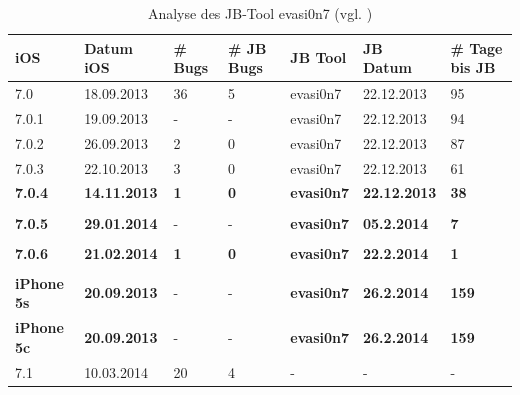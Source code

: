 \begin{table}[htp!]
    \begin{center}
        \begin{tabular}{| p{20mm} | p{22mm} | p{17mm} | p{25mm} | p{20mm} | p{22mm} | p{15mm} |} \hline
            \textbf{iOS} & \textbf{Datum iOS} & \textbf{\# Bugs} & \textbf{\# JB Bugs} & \textbf{JB Tool} & \textbf{JB Datum} & \textbf{\# Tage bis JB} \\ \hline 
7.0 & 18.09.2013 &	36 & 5 & evasi0n7 & 22.12.2013 & 95 \\ \hline
7.0.1 & 19.09.2013 & - & - & evasi0n7 & 22.12.2013 &  94 \\ \hline
7.0.2 & 26.09.2013 & 2 & 0 & evasi0n7 & 22.12.2013 & 87 \\ \hline
7.0.3 & 22.10.2013 & 3 & 0 & evasi0n7 & 22.12.2013 & 61\\ \hline
\textbf{7.0.4 }& \textbf{14.11.2013} & \textbf{1} & \textbf{0} & \textbf{evasi0n7 }& \textbf{22.12.2013} & \textbf{38} \\ \hline
 & & & & & & \\ \hline
\textbf{7.0.5} & \textbf{29.01.2014} & - & - & \textbf{evasi0n7} & \textbf{05.2.2014} & \textbf{7} \\ \hline
& & & & & & \\ \hline
\textbf{7.0.6} & \textbf{21.02.2014} & \textbf{1} & \textbf{0} & \textbf{evasi0n7} & \textbf{22.2.2014} & \textbf{1} \\ \hline
& & & & & & \\ \hline
\textbf{iPhone 5s} & \textbf{20.09.2013} & - & - & \textbf{evasi0n7 }& \textbf{26.2.2014} & \textbf{159} \\ \hline
\textbf{iPhone 5c} & \textbf{20.09.2013} & - & - & \textbf{evasi0n7 }& \textbf{26.2.2014} & \textbf{159} \\ \hline
7.1 & 10.03.2014 & 20 & 4 & - & - & - \\ \hline
        \end{tabular} 
        \caption{Analyse des JB-Tool evasi0n7 (vgl. \cite{Apple[7]}) \protect\footnotemark}
        \label{tab:Analyseevasi0n7}
    \end{center}
\end{table}
\newpage


